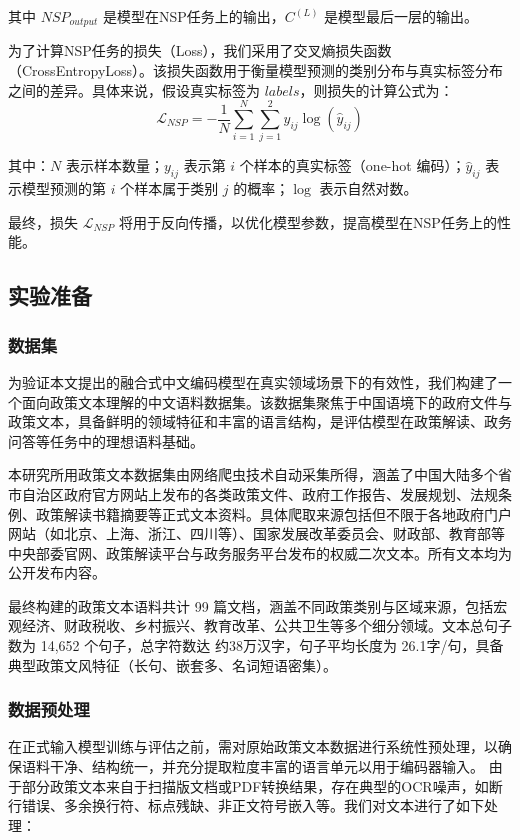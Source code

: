 \documentclass[12pt, a4paper]{ctexart}
\begin{document}
其中 $NSP_{output}$ 是模型在NSP任务上的输出，$C^{(L)}$ 是模型最后一层的输出。

为了计算NSP任务的损失（Loss），我们采用了交叉熵损失函数（CrossEntropyLoss）。该损失函数用于衡量模型预测的类别分布与真实标签分布之间的差异。具体来说，假设真实标签为 $labels$，则损失的计算公式为：
\begin{equation}
    \mathcal{L}_{NSP} = -\frac{1}{N} \sum_{i=1}^{N} \sum_{j=1}^{2} y_{ij} \log(\hat{y}_{ij})
\end{equation}

其中：$N$ 表示样本数量；$y_{ij}$ 表示第 $i$ 个样本的真实标签（one-hot 编码）；$\hat{y}_{ij}$ 表示模型预测的第 $i$ 个样本属于类别 $j$ 的概率；$\log$ 表示自然对数。


最终，损失 $\mathcal{L}_{NSP}$ 将用于反向传播，以优化模型参数，提高模型在NSP任务上的性能。
\subsection{实验准备}
\subsubsection{数据集}
为验证本文提出的融合式中文编码模型在真实领域场景下的有效性，我们构建了一个面向政策文本理解的中文语料数据集。该数据集聚焦于中国语境下的政府文件与政策文本，具备鲜明的领域特征和丰富的语言结构，是评估模型在政策解读、政务问答等任务中的理想语料基础。

本研究所用政策文本数据集由网络爬虫技术自动采集所得，涵盖了中国大陆多个省市自治区政府官方网站上发布的各类政策文件、政府工作报告、发展规划、法规条例、政策解读书籍摘要等正式文本资料。具体爬取来源包括但不限于各地政府门户网站（如北京、上海、浙江、四川等）、国家发展改革委员会、财政部、教育部等中央部委官网、政策解读平台与政务服务平台发布的权威二次文本。所有文本均为公开发布内容。

最终构建的政策文本语料共计 99 篇文档，涵盖不同政策类别与区域来源，包括宏观经济、财政税收、乡村振兴、教育改革、公共卫生等多个细分领域。文本总句子数为 14,652 个句子，总字符数达 约38万汉字，句子平均长度为 26.1字/句，具备典型政策文风特征（长句、嵌套多、名词短语密集）。

\subsubsection{数据预处理}
在正式输入模型训练与评估之前，需对原始政策文本数据进行系统性预处理，以确保语料干净、结构统一，并充分提取粒度丰富的语言单元以用于编码器输入。
由于部分政策文本来自于扫描版文档或PDF转换结果，存在典型的OCR噪声，如断行错误、多余换行符、标点残缺、非正文符号嵌入等。我们对文本进行了如下处理：
\end{document}
